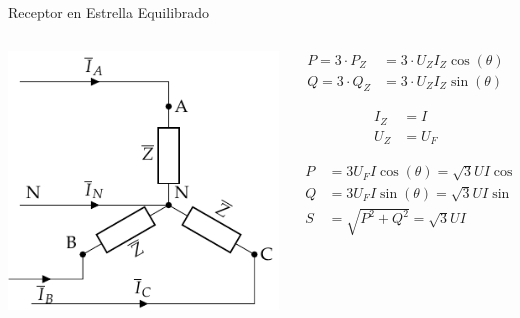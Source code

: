 \documentclass[aspectratio=169, usenames,svgnames,dvipsnames]{beamer}
\begin{document}
\begin{frame}[label={sec:org030afa2}]{Receptor en Estrella Equilibrado}
\begin{columns}
\begin{column}{0.5\columnwidth}
\begin{center}
\includegraphics[width=.9\linewidth]{../figs/EstrellaEquilibrado_Receptor.pdf}
\end{center}
\end{column}

\begin{column}{0.5\columnwidth}
\begin{align*}
  P = 3 \cdot P_Z &= 3 \cdot U_Z I_Z \cos(\theta)\\
  Q = 3 \cdot Q_Z &= 3 \cdot U_Z I_Z \sin(\theta)
\end{align*}

\begin{align*}
  I_Z &= I\\
  U_Z &= U_F
\end{align*}


\begin{align*}
  P &= 3 U_F I \cos(\theta) = \sqrt{3} U I \cos(\theta)\\
  Q &= 3 U_F I \sin(\theta) = \sqrt{3} U I \sin(\theta)\\
  S &= \sqrt{P^2 + Q^2} =  \sqrt{3} U I
\end{align*}
\end{column}
\end{columns}
\end{frame}
\end{document}
